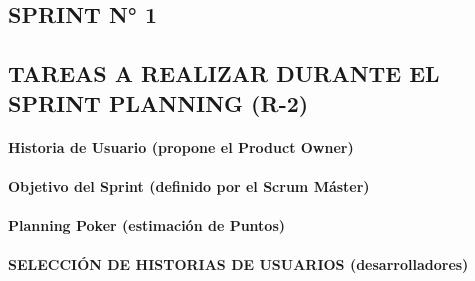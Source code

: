 \begin{doublespace} 


    \renewcommand{\arraystretch}{1.6} %


\section{SPRINT N° 1}
\subsection{TAREAS A REALIZAR DURANTE EL SPRINT PLANNING (R-2)}

\paragraph{\Large\textbf {Historia de Usuario (propone el Product Owner)}}



\clearpage  %
\paragraph{\Large\textbf {Objetivo del Sprint (definido por el Scrum Máster)}}


\paragraph{\Large\textbf {Planning Poker (estimación de Puntos)}}


\clearpage  %
\paragraph{\large\textbf {SELECCIÓN DE HISTORIAS DE USUARIOS (desarrolladores)}}



\end{doublespace}
